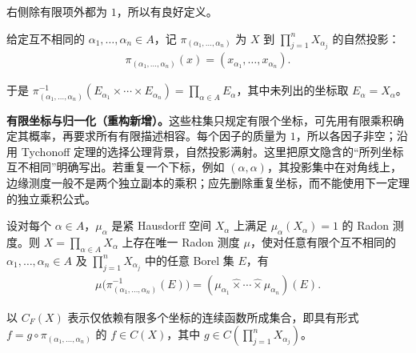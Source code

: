 \documentclass[../../main.tex]{subfiles}
\begin{document}
右侧除有限项外都为 $1$，所以有良好定义。
\begin{definition}[有限坐标投影]\label{definition:ch07-finite-coordinate-projection}
给定互不相同的 $\alpha_1,\ldots,\alpha_n\in A$，记 $\pi_{(\alpha_1,\ldots,\alpha_n)}$ 为 $X$ 到 $\prod_{j=1}^nX_{\alpha_j}$ 的自然投影：
\begin{align*}
\pi_{(\alpha_1,\ldots,\alpha_n)}(x)=(x_{\alpha_1},\ldots,x_{\alpha_n}).
\end{align*}
\end{definition}
于是 $\pi_{(\alpha_1,\ldots,\alpha_n)}^{-1}(E_{\alpha_1}\times\cdots\times E_{\alpha_n})=\prod_{\alpha\in A}E_\alpha$，其中未列出的坐标取 $E_\alpha=X_\alpha$。
\begin{remark}
\textbf{有限坐标与归一化（重构新增）。}这些柱集只规定有限个坐标，可先用有限乘积确定其概率，再要求所有有限描述相容。每个因子的质量为 $1$，所以各因子非空；沿用 Tychonoff 定理的选择公理背景，自然投影满射。这里把原文隐含的“所列坐标互不相同”明确写出。若重复一个下标，例如 $(\alpha,\alpha)$，其投影集中在对角线上，边缘测度一般不是两个独立副本的乘积；应先删除重复坐标，而不能使用下一定理的独立乘积公式。
\end{remark}
\begin{theorem}\label{theorem:ch07-product-regular-borel}
设对每个 $\alpha\in A$，$\mu_\alpha$ 是紧 Hausdorff 空间 $X_\alpha$ 上满足 $\mu_\alpha(X_\alpha)=1$ 的 Radon 测度。则 $X=\prod_{\alpha\in A}X_\alpha$ 上存在唯一 Radon 测度 $\mu$，使对任意有限个互不相同的 $\alpha_1,\ldots,\alpha_n\in A$ 及 $\prod_{j=1}^nX_{\alpha_j}$ 中的任意 Borel 集 $E$，有
\begin{align*}
\mu\bigl(\pi_{(\alpha_1,\ldots,\alpha_n)}^{-1}(E)\bigr)
=(\mu_{\alpha_1}\mathbin{\widehat\times}\cdots\mathbin{\widehat\times}\mu_{\alpha_n})(E).
\end{align*}
\end{theorem}
\begin{definition}[有限坐标连续函数]\label{definition:ch07-finite-coordinate-functions}
以 $C_F(X)$ 表示仅依赖有限多个坐标的连续函数所成集合，即具有形式 $f=g\circ\pi_{(\alpha_1,\ldots,\alpha_n)}$ 的 $f\in C(X)$，其中 $g\in C(\prod_{j=1}^nX_{\alpha_j})$。
\end{definition}
\end{document}
